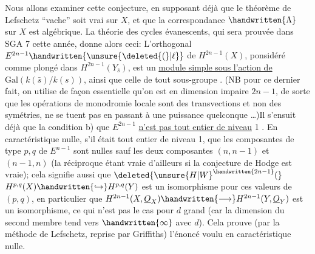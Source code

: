 Nous allons examiner cette conjecture, en supposant déjà que le  théorème de Lefschetz ``vache'' soit vrai sur $X$, et que la correspondance $\handwritten{\Lambda}$ sur $X$ est algébrique. La théorie des cycles évanescents, qui sera prouvée dans SGA 7 cette année, donne alors ceci: L'orthogonal $E^{2n-1}\handwritten{\unsure{\deleted{(}|\ell}}$ de $H^{2n-1}(X)$, ponsidéré comme plongé dans $H^{2n-1}(Y_{\bar s})$, est un \uline{module simple sous l'action de} $\mathrm{Gal}(k(\bar s)/k(s))$, ainsi que  celle de tout sous-groupe . (NB pour ce dernier fait, on utilise de façon essentielle qu'on est en dimension impaire $2n-1$, de sorte que les opérations de monodromie locale sont des transvections et non des symétries,  ne se tuent pas en passant à une puissance quelconque \ldots)Il s'ensuit déjà que  la condition b) que $E^{2n-1}$ \uline{n'est pas tout entier de niveau} 1 . En caractéristique nulle,  s'il était tout entier de niveau 1,  que les composantes de type $p,q$ de $E^{n-1}$ sont nulles sauf les deux composantes $(n,n-1)$ et $(n-1,n)$ (la réciproque étant vraie d'ailleurs si la conjecture de Hodge est vraie); cela  signifie aussi que $\deleted{{\unsure{H|W}}^{\handwritten{2n-1}}(}$ $H^{p,q}(X)\handwritten{\hookrightarrow}H^{p,q}(Y)$ est un isomorphisme pour ces valeurs de $(p,q)$, en particulier que  $H^{2n-1}(X,\underline{O}_X)\handwritten{\longrightarrow}H^{2n-1}(Y,\underline{O}_Y)$ est un isomorphisme, ce qui n'est pas le cas pour $d$ grand (car la dimension du second membre tend vers $\handwritten{\infty}$ avec $d$). Cela prouve (par la méthode de Lefschetz, reprise par Griffiths) l'énoncé voulu en caractéristique nulle.
